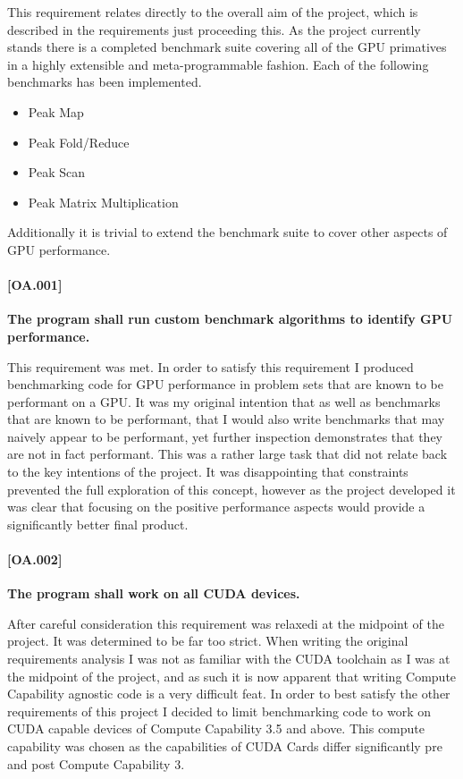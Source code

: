 This requirement relates directly to the overall aim of the project, which is described in the
requirements just proceeding this. As the project currently stands there is a completed benchmark
suite covering all of the GPU primatives in a highly extensible and meta-programmable fashion. Each
of the following benchmarks has been implemented.

\begin{itemize}
\item Peak Map
\item Peak Fold/Reduce
\item Peak Scan
\item Peak Matrix Multiplication
\end{itemize}

Additionally it is trivial to extend the benchmark suite to cover other aspects of GPU performance.

\paragraph{[OA.001]} \label{[OA.001]}
\textbf{The program shall run custom benchmark algorithms to identify GPU performance.}

This requirement was met. In order to satisfy this requirement I produced benchmarking code for GPU
performance in problem sets that are known to be performant on a GPU. It was my original intention
that as well as benchmarks that are known to be performant, that I would also write benchmarks that
may naively appear to be performant, yet further inspection demonstrates that they are not in fact
performant. This was a rather large task that did not relate back to the key intentions of the
project. It was disappointing that constraints prevented the full exploration of this concept,
however as the project developed it was clear that focusing on the positive performance aspects
would provide a significantly better final product.

\paragraph{[OA.002]}
\textbf{The program shall work on all CUDA devices.}

After careful consideration this requirement was relaxedi at the midpoint of the project. It was
determined to be far too strict. When writing the original requirements analysis I was not as
familiar with the CUDA toolchain as I was at the midpoint of the project, and as such it is now
apparent that writing Compute Capability agnostic code is a very difficult feat. In order to best
satisfy the other requirements of this project I decided to limit benchmarking code to work on CUDA
capable devices of Compute Capability 3.5 and above. This compute capability was chosen as the
capabilities of CUDA Cards differ significantly pre and post Compute Capability 3. 

